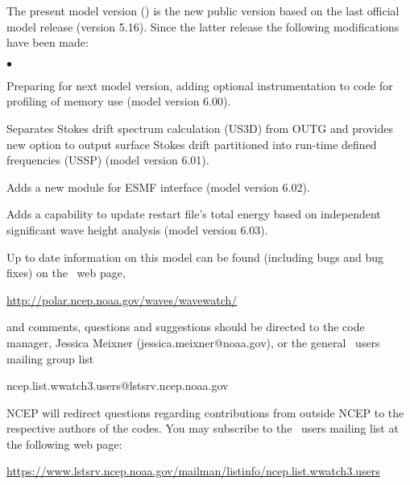 \vspace{\baselineskip} 
\noindent 
The present model version (\WWver) is the new public version based on the
last official model release (version 5.16). Since the latter release the
following modifications have been made:

\begin{list}{$\bullet$}{\rightmargin 5mm \parsep 0mm \itemsep 0mm}

\item Preparing for next model version, adding optional instrumentation to code
      for profiling of memory use (model version 6.00).

\item Separates Stokes drift spectrum calculation (US3D) from OUTG and provides 
      new option to output surface Stokes drift partitioned into run-time defined 
      frequencies (USSP) (model version 6.01).  

\item Adds a new module for ESMF interface (model version 6.02). 

\item Adds a capability to update restart file's total energy based on independent 
      significant wave height analysis (model version 6.03).

\end{list}

\vspace{\baselineskip} \noindent 
Up to date information on this model can be found (including bugs and bug
fixes) on the \ws\ web page, 
\begin{center}
\url{http://polar.ncep.noaa.gov/waves/wavewatch/}
\end{center}
and comments, questions and suggestions should be
directed to the code manager, Jessica Meixner (jessica.meixner@noaa.gov), or the general \ws\ users mailing group list

\begin{center}
ncep.list.wwatch3.users@lstsrv.ncep.noaa.gov
\end{center}

\noindent
NCEP will redirect questions regarding contributions from outside NCEP to the
respective authors of the codes. You may subscribe to the \ws\ users 
mailing list at the following web page:
\begin{center}
\footnotesize
\url{https://www.lstsrv.ncep.noaa.gov/mailman/listinfo/ncep.list.wwatch3.users}
\end{center} 

